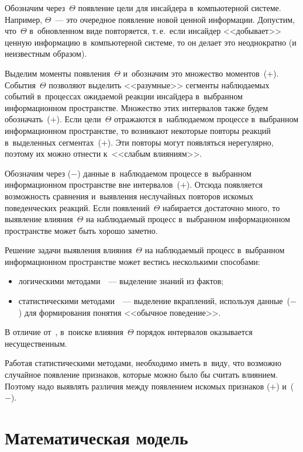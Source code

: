 \begin{multicols}{2}
  Обозначим через~$\Theta$ появление цели для инсайдера в~компьютерной 
системе. Например, $\Theta$~--- это очередное появление новой ценной 
информации. Допустим, что~$\Theta$ в~обновленном виде повторяется, т.\,е.\ если 
инсайдер <<добывает>> ценную информацию в~компьютерной системе, то он 
делает это неоднократно (и неизвестным образом). 
  
  Выделим моменты появления~$\Theta$ и~обозначим это множество 
моментов~($+$). События~$\Theta$ позволяют выделить <<разумные>> сегменты 
наблюдаемых событий в~процессах ожидаемой реакции инсайдера в~выбранном 
информационном пространстве. Множество этих интервалов также будем 
обозначать~($+$). Если цели~$\Theta$ отражаются в~наблюдаемом процессе 
в~выбранном информационном пространстве, то возникают некоторые повторы 
реакций в~выделенных сегментах~($+$). Эти повторы могут появляться 
нерегулярно, поэтому их можно от\-нес\-ти к~<<слабым влияниям>>. 
  
  Обозначим через ($-$) данные в~наблюдаемом процессе в~выбранном 
информационном пространстве вне интервалов~($+$). Отсюда появляется 
возможность сравнения и~выявления неслучайных повторов искомых 
поведенческих реакций. Если появлений~$\Theta$ набирается достаточно много, 
то выявление влияния~$\Theta$ на наблюдаемый процесс в~выбранном 
информационном пространстве может быть хорошо заметно. 
  
  Решение задачи выявления влияния~$\Theta$ на наблюдаемый процесс 
в~выбранном информационном пространстве может вестись несколькими 
способами:
  \begin{itemize}
\item логическими методами~\cite{10-gr}~--- выделение знаний из фактов;
\item статистическими методами~\cite{11-gr}~--- выделение вкраплений, 
используя данные~($-$) для формирования понятия <<обычное 
поведение>>.
\end{itemize}

  В отличие от~\cite{11-gr}, в~поиске влияния~$\Theta$ порядок интервалов 
оказывается несущественным. 
  
  Работая статистическими методами, необходимо иметь в~виду, что возможно 
случайное появление признаков, которые можно было бы считать влиянием. 
Поэтому надо выявлять различия между появлением искомых признаков ($+$) 
и~($-$). 
  
  \section{Математическая модель}
  

\end{multicols}
